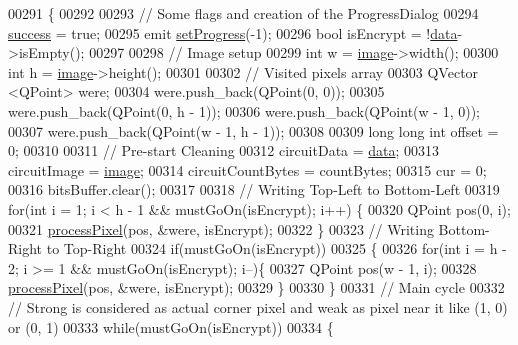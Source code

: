 \begin{DoxyCode}
00291 \{
00292 
00293     \textcolor{comment}{// Some flags and creation of the ProgressDialog}
00294     \mbox{\hyperlink{class_model_p_c_a945ffbbc44a832b953c191debd448f4c}{success}} = \textcolor{keyword}{true};
00295     emit \mbox{\hyperlink{class_model_p_c_a25a4496e129e87ac96f12257a123b84f}{setProgress}}(-1);
00296     \textcolor{keywordtype}{bool} isEncrypt = !\mbox{\hyperlink{namespace_errors_dict_setup_af570460846fb9f0c91abd308a095dcdc}{data}}->isEmpty();
00297 
00298     \textcolor{comment}{// Image setup}
00299     \textcolor{keywordtype}{int} w = \mbox{\hyperlink{namespacetests-setup_ad55b685280f549e15688a94cbb89f512}{image}}->width();
00300     \textcolor{keywordtype}{int} h = \mbox{\hyperlink{namespacetests-setup_ad55b685280f549e15688a94cbb89f512}{image}}->height();
00301 
00302     \textcolor{comment}{// Visited pixels array}
00303     QVector <QPoint> were;
00304     were.push\_back(QPoint(0, 0));
00305     were.push\_back(QPoint(0, h - 1));
00306     were.push\_back(QPoint(w - 1, 0));
00307     were.push\_back(QPoint(w - 1, h - 1));
00308 
00309     \textcolor{keywordtype}{long} \textcolor{keywordtype}{long} \textcolor{keywordtype}{int} offset = 0;
00310 
00311     \textcolor{comment}{// Pre-start Cleaning}
00312     circuitData = \mbox{\hyperlink{namespace_errors_dict_setup_af570460846fb9f0c91abd308a095dcdc}{data}};
00313     circuitImage = \mbox{\hyperlink{namespacetests-setup_ad55b685280f549e15688a94cbb89f512}{image}};
00314     circuitCountBytes = countBytes;
00315     cur = 0;
00316     bitsBuffer.clear();
00317 
00318     \textcolor{comment}{// Writing Top-Left to Bottom-Left}
00319     \textcolor{keywordflow}{for}(\textcolor{keywordtype}{int} i = 1; i < h - 1 && mustGoOn(isEncrypt); i++) \{
00320         QPoint pos(0, i);
00321         \mbox{\hyperlink{class_model_p_c_a1171f9fe1550133dc9053a46b4e5bcfd}{processPixel}}(pos, &were, isEncrypt);
00322     \}
00323     \textcolor{comment}{// Writing Bottom-Right to Top-Right}
00324     \textcolor{keywordflow}{if}(mustGoOn(isEncrypt))
00325     \{
00326         \textcolor{keywordflow}{for}(\textcolor{keywordtype}{int} i = h - 2; i >= 1 && mustGoOn(isEncrypt); i--)\{
00327             QPoint pos(w - 1, i);
00328             \mbox{\hyperlink{class_model_p_c_a1171f9fe1550133dc9053a46b4e5bcfd}{processPixel}}(pos, &were, isEncrypt);
00329         \}
00330     \}
00331     \textcolor{comment}{// Main cycle}
00332     \textcolor{comment}{// Strong is considered as actual corner pixel and weak as pixel near it like (1, 0) or (0, 1)}
00333     \textcolor{keywordflow}{while}(mustGoOn(isEncrypt))
00334     \{

\end{DoxyCode}
